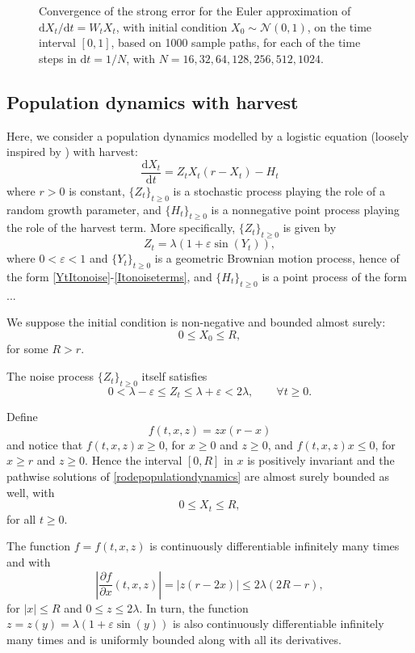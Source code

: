 \documentclass[reqno,12pt]{amsart}
\theoremstyle{plain}%
\theoremstyle{definition}
\begin{document}
\begin{figure}[htb]
    \label{figlinearnonhomogeneousrode}
    \caption{Convergence of the strong error for the Euler approximation of $\mathrm{d}X_t/\mathrm{d}t = W_t X_t$, with initial condition $X_0 \sim \mathcal{N}(0, 1)$, on the time interval $[0, 1]$, based on 1000 sample paths, for each of the time steps in $\mathrm{d}t = 1/N$, with $N = 16, 32, 64, 128, 256, 512, 1024$.}
\end{figure}

\subsection{Population dynamics with harvest}

Here, we consider a population dynamics modelled by a logistic equation (loosely inspired by \cite[Section 15.2]{HanKloeden2017}) with harvest:
\begin{equation}
    \label{rodepopulationdynamics}
    \frac{\mathrm{d}X_t}{\mathrm{d}t} = Z_t X_t (r - X_t) - H_t
\end{equation}
where $r > 0$ is constant, $\{Z_t\}_{t \geq 0}$ is a stochastic process playing the role of a random growth parameter, and $\{H_t\}_{t\geq 0}$ is a nonnegative point process playing the role of the harvest term. More specifically, $\{Z_t\}_{t \geq 0}$ is given by
\[
    Z_t = \lambda (1 + \varepsilon \sin(Y_t)),
\]
where $0 < \varepsilon < 1$ and $\{Y_t\}_{t\geq 0}$ is a geometric Brownian motion process, hence of the form \eqref{YtItonoise}-\eqref{Itonoiseterms}, and $\{H_t\}_{t\geq 0}$ is a point process of the form ...

We suppose the initial condition is non-negative and bounded almost surely:
\[
    0 \leq X_0 \leq R,
\]
for some $R > r$.

The noise process $\{Z_t\}_{t \geq 0}$ itself satisfies
\[
    0 < \lambda - \varepsilon \leq Z_t \leq \lambda + \varepsilon < 2\lambda, \qquad \forall t \geq 0.
\]

Define 
\[
    f(t, x, z) = z x(r - x)
\]
and notice that $f(t, x, z)x \geq 0$, for $x \geq 0$ and $z \geq 0$, and $f(t, x, z)x \leq 0$, for $x \geq r$ and $z \geq 0$. Hence the interval $[0, R]$ in $x$ is positively invariant and the pathwise solutions of \eqref{rodepopulationdynamics} are almost surely bounded as well, with
\[
    0 \leq X_t \leq R,
\]
for all $t \geq 0$.

The function $f=f(t, x, z)$ is continuously differentiable infinitely many times and with
\[
    \left|\frac{\partial f}{\partial x}(t, x, z)\right| = |z(r - 2x)|\leq 2\lambda (2R - r),
\]
for $|x| \leq R$ and $0 \leq z \leq 2\lambda$. In turn, the function $z = z(y) = \lambda (1 + \varepsilon \sin(y))$ is also continuously differentiable infinitely many times and is uniformly bounded along with all its derivatives.
\end{document}
